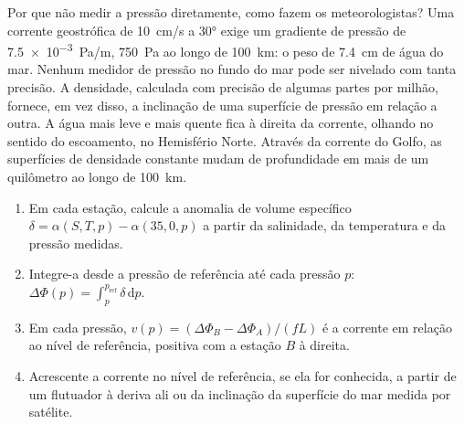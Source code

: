 Por que não medir a pressão diretamente, como fazem os meteorologistas? Uma corrente geostrófica
de \qty{10}{cm/s} a \ang{30} exige um gradiente de pressão de
\qty{7.5e-3}{Pa/m}, \qty{750}{Pa} ao longo de \qty{100}{km}: o peso de
\qty{7.4}{cm} de água do mar. Nenhum medidor de pressão no fundo do mar pode ser
nivelado com tanta precisão. A densidade, calculada com precisão de algumas partes por milhão,
fornece, em vez disso, a inclinação de uma superfície de pressão em relação a outra. A
água mais leve e mais quente fica à direita da corrente, olhando no sentido do escoamento,
no Hemisfério Norte. Através da corrente do Golfo, as superfícies de densidade constante
mudam de profundidade em mais de um quilômetro ao longo de \qty{100}{km}.

\begin{method}\label{met:b3:ocean-dynamics:dynamic}
\begin{enumerate}
\item Em cada estação, calcule a anomalia de volume específico $\delta =
  \alpha(S, T, p) - \alpha(35, 0, p)$ a partir da salinidade,
  da temperatura e da pressão medidas.
\item Integre-a desde a pressão de referência até cada pressão $p$:
  $\Delta\Phi(p) = \int_p^{p_{\text{ref}}}\delta\,\mathrm dp$.
\item Em cada pressão, $v(p) = (\Delta\Phi_B - \Delta\Phi_A)/(fL)$ é
  a corrente em relação ao nível de referência, positiva com a estação $B$
  à direita.
\item Acrescente a corrente no nível de referência, se ela for conhecida, a partir de um flutuador
  à deriva ali ou da inclinação da superfície do mar medida por satélite.
\end{enumerate}
\end{method}

